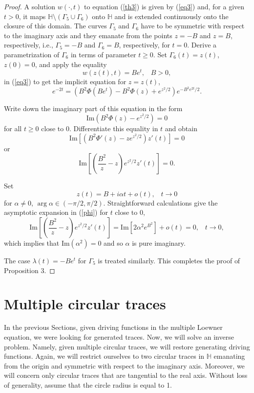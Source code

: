 \documentclass[
11pt,%
tightenlines,%
twoside,%
onecolumn,%
nofloats,%
nobibnotes,%
nofootinbib,%
superscriptaddress,%
noshowpacs,%
centertags]%
{revtex4}
\begin{document}
\begin{proof}
A solution $w(\cdot,t)$ to equation (\ref{th3}) is given by (\ref{eq3}) and, for a given $t>0$, it maps $\mathbb H\setminus(\Gamma_5\cup\Gamma_6)$ onto $\mathbb H$ and is extended continuously onto the closure of this domain. The curves $\Gamma_5$ and $\Gamma_6$ have to be symmetric with respect to the imaginary axis and they emanate from the points $z=-B$ and $z=B$, respectively, i.e., $\Gamma_5=-B$ and $\Gamma_6=B$, respectively, for $t=0$. Derive a parametrization of $\Gamma_6$ in terms of parameter $t\geq0$. Set $\Gamma_6(t)=z(t)$, $z(0)=0$, and apply the equality $$w(z(t),t)=Be^t,\;\;\;B>0,$$ in (\ref{eq3}) to get the implicit equation for $z=z(t)$, $$e^{-2t}=(B^2\Phi(Be^t)-B^2\Phi(z)+e^{z^2/2})e^{-B^2e^{2t}/2}.$$

Write down the imaginary part of this equation in the form $$\text{Im}(B^2\Phi(z)-e^{z^2/2})=0$$ for all $t\geq0$ close to 0. Differentiate this equality in $t$ and obtain $$\text{Im}[(B^2\Phi'(z)-ze^{z^2/2})z'(t)]=0$$ or
\begin{equation}
\text{Im}\left[\left(\frac{B^2}{z}-z\right)e^{z^2/2}z'(t)\right]=0. \label{phi}
\end{equation}

Set $$z(t)=B+i\alpha t+o(t),\;\;\;t\to0$$ for $\alpha\neq0$, $\arg\alpha\in(-\pi/2,\pi/2)$. Straightforward calculations give the asymptotic expansion in (\ref{phi}) for $t$ close to 0, $$\text{Im}\left[\left(\frac{B^2}{z}-z\right)e^{z^2/2}z'(t)\right]=\text{Im}[2\alpha^2e^{B^2}]+o(t)=0,\;\;\;t\to0,$$ which implies that $\text{Im}(\alpha^2)=0$ and so $\alpha$ is pure imaginary.

The case $\lambda(t)=-Be^t$ for $\Gamma_5$ is treated similarly. This completes the proof of Proposition 3.
\end{proof}

\section{Multiple circular traces}

In the previous Sections, given driving functions in the multiple Loewner equation, we were looking for generated traces. Now, we will solve an inverse problem. Namely, given multiple circular traces, we will restore generating driving functions. Again, we will restrict ourselves to two circular traces in $\mathbb H$ emanating from the origin and symmetric with respect to the imaginary axis. Moreover, we will concern only circular traces that are tangential to the real axis. Without loss of generality, assume that the circle radius is equal to 1.
\end{document}
